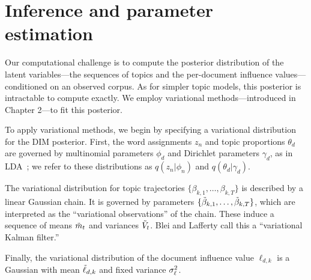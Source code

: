 \section{Inference and parameter estimation}
\label{section:inference}

Our computational challenge is to compute the posterior distribution
of the latent variables---the sequences of topics and the per-document
influence values---conditioned on an observed corpus.  As for simpler
topic models, this posterior is intractable to compute exactly. We
employ variational methods---introduced in Chapter 2---to fit this
posterior.

To apply variational methods, we begin by specifying a variational
distribution for the DIM posterior.  First, the word assignments $z_n$
and topic proportions $\theta_d$ are governed by multinomial
parameters $\phi_d$ and Dirichlet parameters $\gamma_d$, as in
LDA~\cite{blei:2003}; we refer to these distributions as $q(z_n |
\phi_n)$ and $q(\theta_d | \gamma_d)$.

The variational distribution for topic trajectories
$\{\beta_{k,1}, \ldots, \beta_{k,T} \}$ is described by a linear
Gaussian chain.  It is governed by parameters $\{ \tilde{\beta}_{k,1}, \ldots,
\tilde{\beta}_{k,T} \}$, which are interpreted as the ``variational
observations'' of the chain.  These induce a sequence of means $\tilde{m}_t$
and variances $\tilde{V}_t$. Blei and Lafferty \cite{blei:2006} call this a ``variational
Kalman filter.''

Finally, the variational distribution of the document influence value
$\ell_{d,k}$ is a Gaussian with mean $\tilde{\ell}_{d,k}$ and fixed variance
$\sigma^2_{\ell}$.




